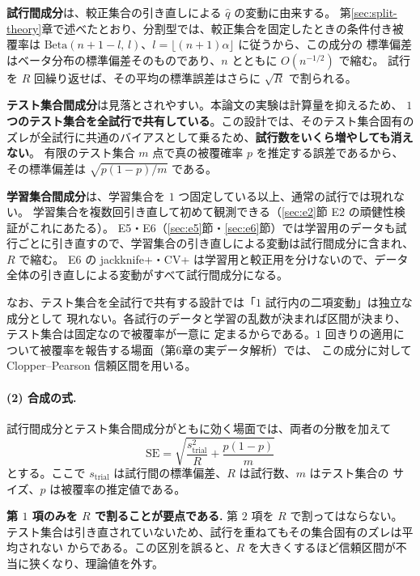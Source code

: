 \documentclass[a4paper,11pt]{jsarticle}
\theoremstyle{definition}
\theoremstyle{plain}
\theoremstyle{remark}
\newcommand{\qhat}{\hat{q}}
\begin{document}
\textbf{試行間成分}は、較正集合の引き直しによる $\qhat$ の変動に由来する。
第\ref{sec:split-theory}章で述べたとおり、分割型では、較正集合を固定したときの条件付き被覆率は
$\mathrm{Beta}(n+1-l,\,l)$、$l=\lfloor(n+1)\alpha\rfloor$ に従うから、この成分の
標準偏差はベータ分布の標準偏差そのものであり、$n$ とともに $O(n^{-1/2})$ で縮む。
試行を $R$ 回繰り返せば、その平均の標準誤差はさらに $\sqrt{R}$ で割られる。

\textbf{テスト集合間成分}は見落とされやすい。本論文の実験は計算量を抑えるため、
\textbf{$1$ つのテスト集合を全試行で共有している}。この設計では、そのテスト集合固有の
ズレが全試行に共通のバイアスとして乗るため、\textbf{試行数をいくら増やしても消えない}。
有限のテスト集合 $m$ 点で真の被覆確率 $p$ を推定する誤差であるから、その標準偏差は
$\sqrt{p(1-p)/m}$ である。

\textbf{学習集合間成分}は、学習集合を $1$ つ固定している以上、通常の試行では現れない。
学習集合を複数回引き直して初めて観測できる（\ref{sec:e2}節 E2 の頑健性検証がこれにあたる）。
E5・E6（\ref{sec:e5}節・\ref{sec:e6}節）では学習用のデータも試行ごとに引き直すので、学習集合の引き直しによる変動は試行間成分に含まれ、$R$ で縮む。
E6 の jackknife+・CV+ は学習用と較正用を分けないので、データ全体の引き直しによる変動がすべて試行間成分になる。

なお、テスト集合を全試行で共有する設計では「$1$ 試行内の二項変動」は独立な成分として
現れない。各試行のデータと学習の乱数が決まれば区間が決まり、テスト集合は固定なので被覆率が一意に
定まるからである。$1$ 回きりの適用について被覆率を報告する場面（第6章の実データ解析）では、
この成分に対して Clopper--Pearson 信頼区間を用いる。

\paragraph{(2) 合成の式.}
試行間成分とテスト集合間成分がともに効く場面では、両者の分散を加えて
\begin{equation}
  \label{eq:se-composite}
  \mathrm{SE}=\sqrt{\frac{s_{\mathrm{trial}}^{2}}{R}+\frac{p(1-p)}{m}}
\end{equation}
とする。ここで $s_{\mathrm{trial}}$ は試行間の標準偏差、$R$ は試行数、$m$ はテスト集合の
サイズ、$p$ は被覆率の推定値である。

\textbf{第 $1$ 項のみを $R$ で割ることが要点である.} 第 $2$ 項を $R$ で割ってはならない。
テスト集合は引き直されていないため、試行を重ねてもその集合固有のズレは平均されない
からである。この区別を誤ると、$R$ を大きくするほど信頼区間が不当に狭くなり、理論値を外す。
\end{document}
